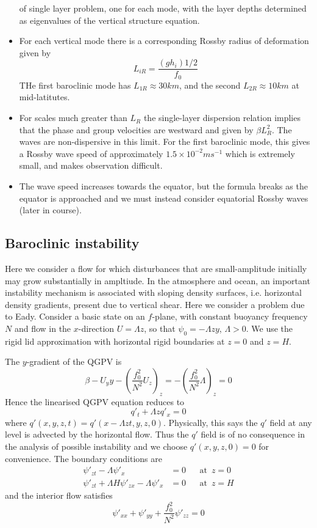 \documentclass{jknotes}
\begin{document}
\begin{itemize}
		of single layer problem, one for each mode, with the layer depths
		determined as eigenvalues of the vertical structure equation.
	\item For each vertical mode there is a corresponding Rossby radius of
		deformation given by
		\begin{equation}
			L_{iR} = \frac{(gh_i){1/2}}{f_0}
		\end{equation}
		THe first baroclinic mode has $L_{1R} \approx 30 km$, and the second
		$L_{2R} \approx 10 km$ at mid-latitutes.
	\item For scales much greater than $L_{R}$ the single-layer dispersion
		relation implies that the phase and group velocities are westward and
		given by $\beta L_R^2$. The waves are non-dispersive in this limit.
		For the first baroclinic mode, this gives a Rossby wave speed of
		approximately $1.5 \times 10^{-2} ms^{-1}$ which is extremely small,
		and makes observation difficult.
	\item The wave speed increases towards the equator, but the formula breaks
		as the equator is approached and we must instead consider equatorial
		Rossby waves (later in course).
\end{itemize}

\subsection{Baroclinic instability}
Here we consider a flow for which disturbances that are small-amplitude
initially may grow substantially in ampltiude.  In the atmosphere and ocean,
an important instability mechanism is associated with sloping density
surfaces, i.e. horizontal density gradients, present due to vertical shear.
Here we consider a problem due to Eady. Consider a basic state on an
$f$-plane, with constant buoyancy frequency $N$ and flow in the $x$-direction
$U = \Lambda z$, so that $\psi_0 = -\Lambda z y$, $\Lambda > 0$. We use the
rigid lid approximation with horizontal rigid boundaries at $z=0$ and $z= H$.

The $y$-gradient of the QGPV is
\begin{equation}
	\beta - U_yy - (\frac{f_0^2}{N^2} U_z)_z = -(\frac{f_0^2}{N^2} \Lambda)_z
	= 0
\end{equation}
Hence the linearised QGPV equation reduces to
\begin{equation}
	q'_t + \Lambda z q'_x = 0
\end{equation}
where $q'(x,y,z,t) = q'(x-\Lambda z t, y, z, 0)$. Physically, this says the
$q'$ field at any level is advected by the horizontal flow. Thus the $q'$
field is of no consequence in the analysis of possible instability and we
choose $q'(x,y,z,0)= 0$ for convenience. The boundary conditions are
\begin{align}
	\psi'_{zt} - \Lambda \psi'_x &= 0 &&\text{at}\,\,\, z=0 \\
	\psi'_{zt}+\Lambda H \psi'_{zx} - \Lambda \psi'_x &= 0 &&\text{at} \,\,\,z
	=H
\end{align}
and the interior flow satisfies
\begin{equation}
	\psi'_{xx} + \psi'_{yy} + \frac{f_0^2}{N^2} \psi'_{zz} = 0
\end{equation}
\end{document}
